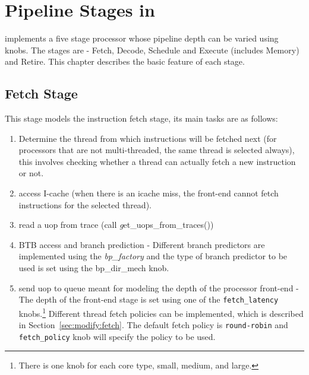 


\chapter{Pipeline Stages in \SIM}

\SIM implements a five stage processor whose pipeline depth can be varied using
knobs. The stages are - Fetch, Decode, Schedule and Execute (includes
    Memory) and Retire. This chapter describes the basic feature of each
stage.

\section{Fetch Stage}
This stage models the instruction fetch stage, its main tasks
are as follows:

\begin{enumerate}

\item Determine the thread from which instructions will be fetched next (for
    processors that are not multi-threaded, the same thread is selected
    always), this involves checking whether a thread can actually fetch a new
instruction or not.


\item access I-cache (when there is an icache miss, the front-end cannot fetch
    instructions for the selected thread).

\item read a uop from trace (call {\textit get\_uops\_from\_traces()})

\item BTB access and branch prediction - Different branch predictors
  are implemented using the \textit{bp\_factory} and the type of
  branch predictor to be used is set using the bp\_dir\_mech knob.

\item send uop to queue meant for modeling the depth of the processor
  front-end - The depth of the front-end stage is set using one of the
  \Verb+fetch_latency+ knobs.\footnote{There is one knob for each core
    type, small, medium, and large.} Different thread fetch policies
  can be implemented, which is described in
  Section~\ref{sec:modify:fetch}. The default fetch policy is
  \Verb+round-robin+ and \Verb+fetch_policy+ knob will specify the
  policy to be used.


\end{enumerate}


